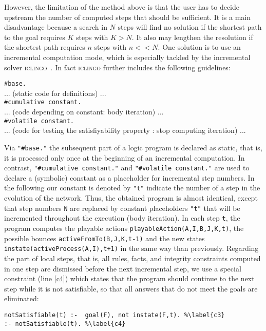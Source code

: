 However, the limitation of the method above is that the user has to decide upstream
the number of computed steps that should be sufficient.
It is a main disadvantage because a search in $N$ steps will find no solution
if the shortest path to the goal requires $K$ steps with $K > N$. It also may lengthen the resolution if the shortest path requires $n$ steps with $n << N$.
One solution is to use an incremental computation mode,
which is especially tackled by the incremental solver \textsc{iclingo}~\cite{gebser2008user}. In fact \textsc{iclingo} further includes the following guidelines:

\begin{tabbing}
\texttt{\#base.}  \\
... (static code for definitions) ... \\
\texttt{\#cumulative constant.}  \\
... (code depending on constant: body iteration) ... \\
\texttt{\#volatile constant.} \\
... (code for testing the satisfiyability property : stop computing iteration) ...
\end{tabbing}

Via \texttt{"\#base."} the subsequent part of a logic program is declared as static, that is, it is processed only once at the beginning of an incremental computation. In contrast, \texttt{"\#cumulative constant."} and \texttt{"\#volatile constant."}  are used to declare a (symbolic) constant as a placeholder for incremental step numbers.
In the following our constant is denoted by \texttt{"t"} indicate the number of a step in the evolution of the network.
Thus, the obtained program is almost identical,
except that step numbers \texttt{N}
are replaced by constant placeholders \texttt{"t"}
that will be incremented throughout the execution (body iteration).
In each step \texttt{t}, the program computes the playable actions \texttt{playableAction(A,I,B,J,K,t)}, the possible bounces \texttt{activeFromTo(B,J,K,t-1)}
and the new states \texttt{instate(activeProcess(A,I),t+1)}
in the same way than previously.
Regarding the part of local steps, that is, all rules, facts, and integrity constraints computed in one step are dismissed before the next incremental step,
we use a special constraint (line \ref{c4})
which states that the program should continue to the next step
while it is not satisfiable,
so that all answers that do not meet the goals are eliminated:
\begin{lstlisting}
notSatisfiable(t) :-  goal(F), not instate(F,t). %\label{c3}
:- notSatisfiable(t). %\label{c4}
\end{lstlisting}
